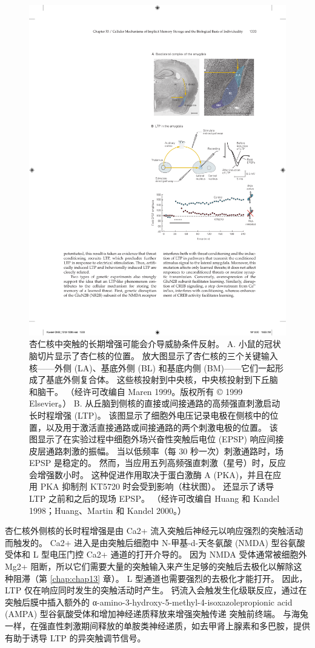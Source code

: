 \begin{figure}[htbp]
	\centering
	\includegraphics[width=0.6\linewidth]{chap53/fig_53_15}
	\caption{杏仁核中突触的长期增强可能会介导威胁条件反射。 A. 小鼠的冠状脑切片显示了杏仁核的位置。 放大图显示了杏仁核的三个关键输入核——外侧 (LA)、基底外侧 (BL) 和基底内侧 (BM)——它们一起形成了基底外侧复合体。 这些核投射到中央核，中央核投射到下丘脑和脑干。 （经许可改编自 Maren 1999。版权所有 © 1999 Elsevier。） B. 从丘脑到侧核的直接或间接通路的高频强直刺激启动长时程增强 (LTP)。 该图显示了细胞外电压记录电极在侧核中的位置，以及用于激活直接通路或间接通路的两个刺激电极的位置。 该图显示了在实验过程中细胞外场兴奋性突触后电位 (EPSP) 响应间接皮层通路刺激的振幅。 当以低频率（每 30 秒一次）刺激通路时，场 EPSP 是稳定的。 然而，当应用五列高频强直刺激（星号）时，反应会增强数小时。 这种促进作用取决于蛋白激酶 A (PKA)，并且在应用 PKA 抑制剂 KT5720 时会受到影响（柱状图）。 还显示了诱导 LTP 之前和之后的现场 EPSP。 （经许可改编自 Huang 和 Kandel 1998；Huang、Martin 和 Kandel 2000。）}
	\label{fig:53_15}
\end{figure}


杏仁核外侧核的长时程增强是由 Ca2+ 流入突触后神经元以响应强烈的突触活动而触发的。
Ca2+ 进入是由突触后细胞中 N-甲基-d-天冬氨酸 (NMDA) 型谷氨酸受体和 L 型电压门控 Ca2+ 通道的打开介导的。
因为 NMDA 受体通常被细胞外 Mg2+ 阻断，所以它们需要大量的突触输入来产生足够的突触后去极化以解除这种阻滞（第 \ref{chap:chap13} 章）。
L 型通道也需要强烈的去极化才能打开。 因此，LTP 仅在响应同时发生的突触活动时产生。
钙流入会触发生化级联反应，通过在突触后膜中插入额外的 α-amino-3-hydroxy-5-methyl-4-isoxazolepropionic acid (AMPA) 型谷氨酸受体和增加神经递质释放来增强突触传递 突触前终端。
与海兔一样，在强直性刺激期间释放的单胺类神经递质，如去甲肾上腺素和多巴胺，提供有助于诱导 LTP 的异突触调节信号。


